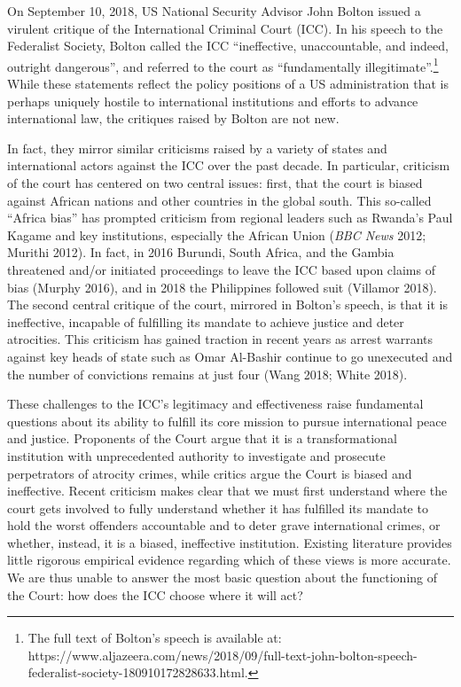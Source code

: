 On September 10, 2018, US National Security Advisor John Bolton issued a virulent critique of the International Criminal Court (ICC). In his speech to the Federalist Society, Bolton called the ICC ``ineffective, unaccountable, and indeed, outright dangerous'', and referred to the court as ``fundamentally illegitimate''.\footnote{The full text of Bolton's speech is available at: https://www.aljazeera.com/news/2018/09/full-text-john-bolton-speech-federalist-society-180910172828633.html.} While these statements reflect the policy positions of a US administration that is perhaps uniquely hostile to international institutions and efforts to advance international law, the critiques raised by Bolton are not new.

In fact, they mirror similar criticisms raised by a variety of states and international actors against the ICC over the past decade. In particular, criticism of the court has centered on two central issues: first, that the court is biased against African nations and other countries in the global south. This so-called ``Africa bias'' has prompted criticism from regional leaders such as Rwanda's Paul Kagame and key institutions, especially the African Union (\emph{BBC News} 2012; Murithi 2012). In fact, in 2016 Burundi, South Africa, and the Gambia threatened and/or initiated proceedings to leave the ICC based upon claims of bias (Murphy 2016), and in 2018 the Philippines followed suit (Villamor 2018). The second central critique of the court, mirrored in Bolton's speech, is that it is ineffective, incapable of fulfilling its mandate to achieve justice and deter atrocities. This criticism has gained traction in recent years as arrest warrants against key heads of state such as Omar Al-Bashir continue to go unexecuted and the number of convictions remains at just four (Wang 2018; White 2018).

These challenges to the ICC's legitimacy and effectiveness raise fundamental questions about its ability to fulfill its core mission to pursue international peace and justice. Proponents of the Court argue that it is a transformational institution with unprecedented authority to investigate and prosecute perpetrators of atrocity crimes, while critics argue the Court is biased and ineffective. Recent criticism makes clear that we must first understand where the court gets involved to fully understand whether it has fulfilled its mandate to hold the worst offenders accountable and to deter grave international crimes, or whether, instead, it is a biased, ineffective institution. Existing literature provides little rigorous empirical evidence regarding which of these views is more accurate. We are thus unable to answer the most basic question about the functioning of the Court: how does the ICC choose where it will act?

